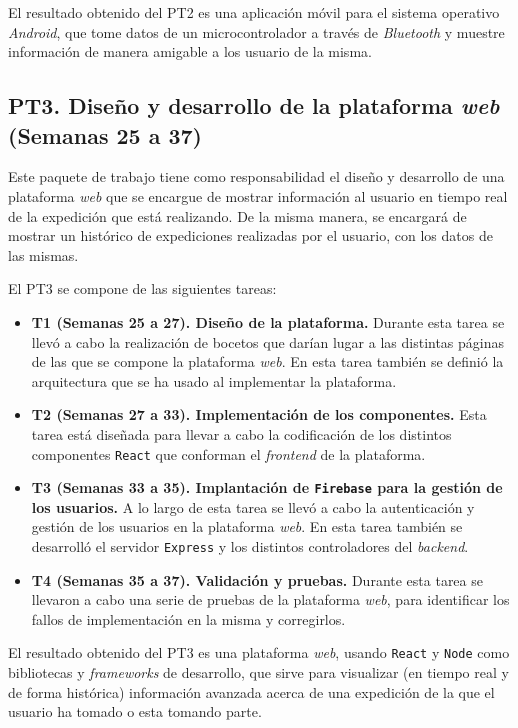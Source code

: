 El resultado obtenido del \ac{PT}2 es una aplicación móvil para el sistema operativo \textit{Android}, que tome datos de un microcontrolador a través de \textit{Bluetooth} y muestre información de manera amigable a los usuario de la misma.

\subsection{\ac{PT}3. Diseño y desarrollo de la plataforma \textit{web} (Semanas 25 a 37)}

Este paquete de trabajo tiene como responsabilidad el diseño y desarrollo de una plataforma \textit{web} que se encargue de mostrar información al usuario en tiempo real de la expedición que está realizando. De la misma manera, se encargará de mostrar un histórico de expediciones realizadas por el usuario, con los datos de las mismas.

El \ac{PT}3 se compone de las siguientes tareas:

\begin{itemize}
\item \textbf{\ac{T}1 (Semanas 25 a 27). Diseño de la plataforma.} Durante esta tarea se llevó a cabo la realización de bocetos que darían lugar a las distintas páginas de las que se compone la plataforma \textit{web}. En esta tarea también se definió la arquitectura que se ha usado al implementar la plataforma.
\item \textbf{\ac{T}2 (Semanas 27 a 33). Implementación de los componentes.} Esta tarea está diseñada para llevar a cabo la codificación de los distintos componentes \texttt{React} que conforman el \textit{frontend} de la plataforma. 
\item \textbf{\ac{T}3 (Semanas 33 a 35). Implantación de \texttt{Firebase} para la gestión de los usuarios.} A lo largo de esta tarea se llevó a cabo la autenticación y gestión de los usuarios en la plataforma \textit{web}. En esta tarea también se desarrolló el servidor \texttt{Express} y los distintos controladores del \textit{backend}.
\item \textbf{\ac{T}4 (Semanas 35 a 37). Validación y pruebas.} Durante esta tarea se llevaron a cabo una serie de pruebas de la plataforma \textit{web}, para identificar los fallos de implementación en la misma y corregirlos.
\end{itemize}

El resultado obtenido del \ac{PT}3 es una plataforma \textit{web}, usando \texttt{React} y \texttt{Node} como bibliotecas y \textit{frameworks} de desarrollo, que sirve para visualizar (en tiempo real y de forma histórica) información avanzada acerca de una expedición de la que el usuario ha tomado o esta tomando parte.

